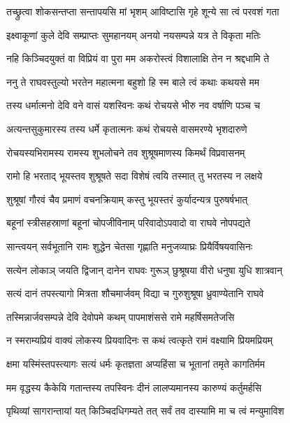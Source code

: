 \twolineshloka
{तच्छ्रुत्वा शोकसन्तप्ता सन्तापयसि मां भृशम्}
{आविष्टासि गृहे शून्ये सा त्वं परवशं गता} %

\twolineshloka
{इक्ष्वाकूणां कुले देवि सम्प्राप्तः सुमहानयम्}
{अनयो नयसम्पन्ने यत्र ते विकृता मतिः} %

\twolineshloka
{नहि किञ्चिदयुक्तं वा विप्रियं वा पुरा मम}
{अकरोस्त्वं विशालाक्षि तेन न श्रद्दधामि ते} %

\twolineshloka
{ननु ते राघवस्तुल्यो भरतेन महात्मना}
{बहुशो हि स्म बाले त्वं कथाः कथयसे मम} %

\twolineshloka
{तस्य धर्मात्मनो देवि वने वासं यशस्विनः}
{कथं रोचयसे भीरु नव वर्षाणि पञ्च च} %

\twolineshloka
{अत्यन्तसुकुमारस्य तस्य धर्मे कृतात्मनः}
{कथं रोचयसे वासमरण्ये भृशदारुणे} %

\twolineshloka
{रोचयस्यभिरामस्य रामस्य शुभलोचने}
{तव शुश्रूषमाणस्य किमर्थं विप्रवासनम्} %

\twolineshloka
{रामो हि भरताद् भूयस्तव शुश्रूषते सदा}
{विशेषं त्वयि तस्मात् तु भरतस्य न लक्षये} %

\twolineshloka
{शुश्रूषां गौरवं चैव प्रमाणं वचनक्रियाम्}
{कस्तु भूयस्तरं कुर्यादन्यत्र पुरुषर्षभात्} %

\twolineshloka
{बहूनां स्त्रीसहस्राणां बहूनां चोपजीविनाम्}
{परिवादोऽपवादो वा राघवे नोपपद्यते} %

\twolineshloka
{सान्त्वयन् सर्वभूतानि रामः शुद्धेन चेतसा}
{गृह्णाति मनुजव्याघ्रः प्रियैर्विषयवासिनः} %

\twolineshloka
{सत्येन लोकाञ् जयति द्विजान् दानेन राघवः}
{गुरूञ् छुश्रूषया वीरो धनुषा युधि शात्रवान्} %

\twolineshloka
{सत्यं दानं तपस्त्यागो मित्रता शौचमार्जवम्}
{विद्या च गुरुशुश्रूषा ध्रुवाण्येतानि राघवे} %

\twolineshloka
{तस्मिन्नार्जवसम्पन्ने देवि देवोपमे कथम्}
{पापमाशंससे रामे महर्षिसमतेजसि} %

\twolineshloka
{न स्मराम्यप्रियं वाक्यं लोकस्य प्रियवादिनः}
{स कथं त्वत्कृते रामं वक्ष्यामि प्रियमप्रियम्} %

\twolineshloka
{क्षमा यस्मिंस्तपस्त्यागः सत्यं धर्मः कृतज्ञता}
{अप्यहिंसा च भूतानां तमृते कागतिर्मम} %

\twolineshloka
{मम वृद्धस्य कैकेयि गतान्तस्य तपस्विनः}
{दीनं लालप्यमानस्य कारुण्यं कर्तुमर्हसि} %

\twolineshloka
{पृथिव्यां सागरान्तायां यत् किञ्चिदधिगम्यते}
{तत् सर्वं तव दास्यामि मा च त्वं मन्युमाविश} %

